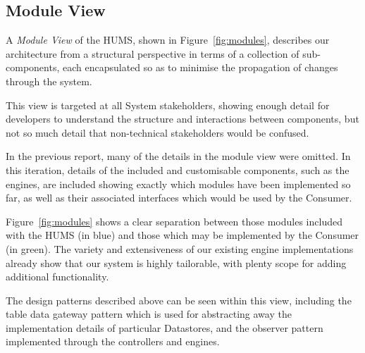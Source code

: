 \documentclass[10pt,a4paper]{article}
\begin{document}
\subsection{Module View}
\label{sec:views}
A \emph{Module View} of the HUMS, shown in Figure~\ref{fig:modules}, describes our architecture from a structural perspective in terms of a collection of sub-components, each encapsulated so as to minimise the propagation of changes through the system. %

This view is targeted at all System stakeholders, showing enough detail for developers to understand the structure and interactions between components, but not so much detail that non-technical stakeholders would be confused.

In the previous report, many of the details in the module view were omitted. In this iteration, details of the included and customisable components, such as the engines, are included showing exactly which modules have been implemented so far, as well as their associated interfaces which would be used by the Consumer. 

Figure~\ref{fig:modules} shows a clear separation between those modules included with the HUMS (in blue) and those which may be implemented by the Consumer (in green). The variety and extensiveness of our existing engine implementations already show that our system is highly tailorable, with plenty scope for adding additional functionality.

The design patterns described above can be seen within this view, including the table data gateway pattern which is used for abstracting away the implementation details of particular Datastores, and the observer pattern implemented through the controllers and engines.
\end{document}
